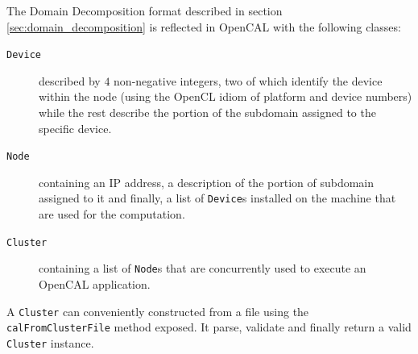 The Domain Decomposition format described in section \ref{sec:domain_decomposition} is reflected in OpenCAL with the following classes:
\begin{description}
	\item[\texttt{Device}] described by $4$ non-negative integers, two of which identify the device  within the node (using the OpenCL idiom of platform and device numbers) while the rest describe the portion of the subdomain assigned to the specific device.
	\item[\texttt{Node}] containing an IP address, a description of the portion of subdomain assigned to it and finally, a list of \texttt{Device}s installed on the machine that are used for the computation.
	\item [\texttt{Cluster}] containing a list of \texttt{Node}s that are concurrently used to  execute an OpenCAL application.
\end{description}
A \texttt{Cluster} can conveniently constructed from a file using the \texttt{calFromClusterFile} method exposed. It parse, validate and finally return a valid \texttt{Cluster} instance.

